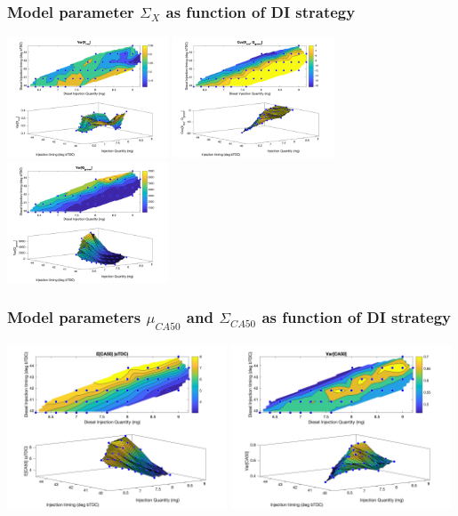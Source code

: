 \documentclass[aspectratio=169, 10pt]{beamer}
\begin{document}
\begin{frame}
\frametitle{Model parameter $\Sigma_X$ as function of DI strategy}
\begin{center}
\includegraphics[width=0.36\textwidth]{../Model_Plots/Sigma_X_11.png}
\includegraphics[width=0.36\textwidth]{../Model_Plots/Sigma_X_12.png}
\includegraphics[width=0.36\textwidth]{../Model_Plots/Sigma_X_22.png}
\end{center}
\end{frame}

\begin{frame}
\frametitle{Model parameters $\mu_{CA50}$ and  $\Sigma_{CA50}$ as function of DI strategy}
\begin{center}
\includegraphics[width=0.49\textwidth]{../Model_Plots/mu_CA50.png}
\includegraphics[width=0.49\textwidth]{../Model_Plots/Sigma_CA50.png}
\end{center}
\end{frame}
\end{document}
